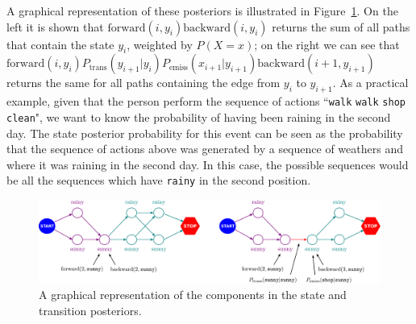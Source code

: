 A graphical representation of these posteriors is illustrated in Figure~\ref{fig:posteriors}. 
On the left it is shown that $\mathrm{forward}(i, y_i) \mathrm{backward}(i, y_i)$ returns the sum of all paths that contain the state $y_i$, weighted by $P(X=x)$; on the right we can see that $\mathrm{forward}(i, y_i) P_{\mathrm{trans}}(y_{i+1}|y_i)P_{\mathrm{emiss}}(x_{i+1}|y_{i+1}) \mathrm{backward}(i+1, y_{i+1})$  returns the same for all paths containing the edge from $y_i$ to $y_{i+1}$.
As a practical example, given that the person perform the sequence of actions ``{\tt walk} {\tt walk} {\tt shop} {\tt clean}", we want to know the probability of having been raining in the second day. The state posterior probability for this event can be seen as the probability that the sequence of actions above was generated by a sequence of weathers and where it was raining in the second day. In this case, the possible sequences would be all the sequences which have {\tt rainy} in the second position.

\begin{figure}
\begin{center}
\includegraphics[width=1\textwidth]{figs/sequences/posteriors}
\caption[Posterior Illustration.]{\label{fig:posteriors} A graphical representation of the components in the state and transition posteriors.}
\end{center}
\end{figure}

%
%

